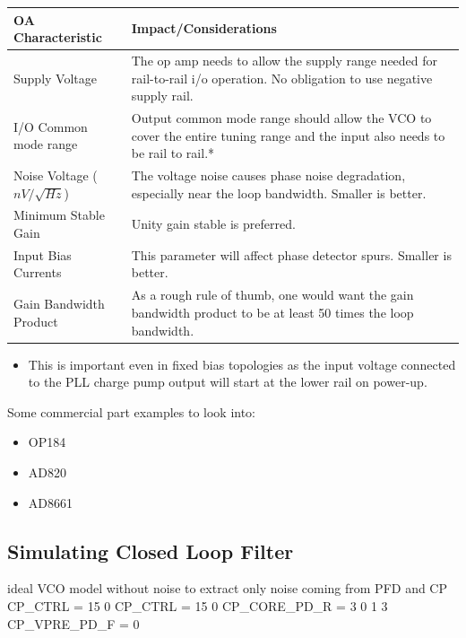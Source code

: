 \documentclass{article}
\begin{document}
\begin{table}[!ht]
    \centering
    \begin{tabular}{|l|p{100mm}|}
    \hline
		\rowcolor{LightCyan}
        OA Characteristic & Impact/Considerations \\ \hline
        Supply Voltage & The op amp needs to allow the supply range needed for rail-to-rail i/o operation. No obligation to use negative supply rail. \\ \hline
        I/O Common mode range & Output common mode range should allow the VCO to cover the entire tuning range and the input also needs to be rail to rail.* \\ \hline
        Noise Voltage ($nV/\sqrt{Hz}$) & The voltage noise causes phase noise degradation, especially near the loop bandwidth. Smaller is better. \\ \hline
        Minimum Stable Gain & Unity gain stable is preferred. \\ \hline
        Input Bias Currents & This parameter will affect phase detector spurs. Smaller is better. \\ \hline
        Gain Bandwidth Product & As a rough rule of thumb, one would want the gain bandwidth product to be at least 50 times the loop bandwidth. 
		\\ \hline
    \end{tabular}
\end{table}

\begin{itemize}
	\item [*] This is important even in fixed bias topologies as the input voltage connected to the PLL charge pump output will start at the lower rail on power-up.
\end{itemize}

Some commercial part examples to look into:
\begin{itemize}
	\item OP184
	\item AD820
	\item AD8661 
\end{itemize}


\subsection{Simulating Closed Loop Filter}

ideal VCO model without noise to extract only noise coming from PFD and CP
CP\_CTRL = 15 0
CP\_CTRL = 15 0
CP\_CORE\_PD\_R = 3 0 1 3 
CP\_VPRE\_PD\_F = 0
\end{document}
